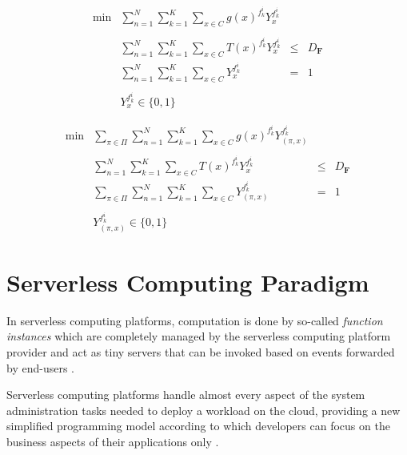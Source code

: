 
\begin{equation}
\begin{array} {lllrr} 
\text{min} & \displaystyle\sum_{n = 1}^N \sum_{k = 1}^K \sum_{x \in C} g(x)^{f_k^i} Y_x^{f_k^i} \\\\
& \displaystyle\sum_{n = 1}^N \sum_{k = 1}^K \sum_{x \in C} T(x)^{f_k^i} Y_x^{f_k^i} & \leq &  D_{\textbf{F}} \\
& \displaystyle\sum_{n = 1}^N \sum_{k = 1}^K \sum_{x \in C} Y_x^{f_k^i} & = & 1 \\\\
& Y_x^{f_k^i} \in \lbrace 0, 1 \rbrace &&
\end{array}
\end{equation}


\begin{equation}
\begin{array} {lllrr} 
\text{min} & \displaystyle\sum_{\pi \in \Pi} \sum_{n = 1}^N \sum_{k = 1}^K \sum_{x \in C} g(x)^{f_k^i} Y_{(\pi, x)}^{f_k^i} \\\\
& \displaystyle\sum_{n = 1}^N \sum_{k = 1}^K \sum_{x \in C} T(x)^{f_k^i} Y_x^{f_k^i} & \leq &  D_{\textbf{F}} \\
& \displaystyle\sum_{\pi \in \Pi} \sum_{n = 1}^N \sum_{k = 1}^K \sum_{x \in C} Y_{(\pi, x)}^{f_k^i} & = & 1 \\\\
& Y_{(\pi, x)}^{f_k^i} \in \lbrace 0, 1 \rbrace &&
\end{array}
\end{equation}


\newpage

\section{Serverless Computing Paradigm}

In serverless computing platforms, computation is done by so-called \textit{function instances} which are completely managed by the serverless computing platform provider and act as tiny servers that can be invoked based on events forwarded by end-users \cite{PMSCP}.

Serverless computing platforms handle almost every aspect of the system administration tasks needed to deploy a workload on the cloud, providing a new simplified programming model according to which developers can focus on the business aspects of their applications only \cite{COSE}.

